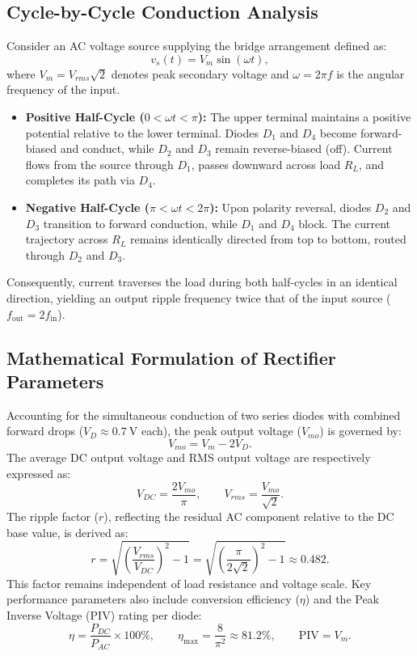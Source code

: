 \subsection{Cycle-by-Cycle Conduction Analysis}
Consider an AC voltage source supplying the bridge arrangement defined as:
\[
v_s(t) = V_m \sin(\omega t),
\]
where $V_m = V_{rms}\sqrt{2}$ denotes peak secondary voltage and $\omega = 2\pi f$ is the angular frequency of the input.
\begin{itemize}
	\item \textbf{Positive Half-Cycle ($0 < \omega t < \pi$):} The upper terminal maintains a positive potential relative to the lower terminal. Diodes $D_1$ and $D_4$ become forward-biased and conduct, while $D_2$ and $D_3$ remain reverse-biased (off). Current flows from the source through $D_1$, passes downward across load $R_L$, and completes its path via $D_4$.
	\item \textbf{Negative Half-Cycle ($\pi < \omega t < 2\pi$):} Upon polarity reversal, diodes $D_2$ and $D_3$ transition to forward conduction, while $D_1$ and $D_4$ block. The current trajectory across $R_L$ remains identically directed from top to bottom, routed through $D_2$ and $D_3$.
\end{itemize}
Consequently, current traverses the load during both half-cycles in an identical direction, yielding an output ripple frequency twice that of the input source ($f_{\text{out}} = 2 f_{\text{in}}$).

\subsection{Mathematical Formulation of Rectifier Parameters}
Accounting for the simultaneous conduction of two series diodes with combined forward drops ($V_D \approx \qty{0.7}{\volt}$ each), the peak output voltage ($V_{mo}$) is governed by:
\[
V_{mo} = V_m - 2V_D.
\]
The average DC output voltage and RMS output voltage are respectively expressed as:
\[
V_{DC} = \frac{2V_{mo}}{\pi}, \qquad V_{rms} = \frac{V_{mo}}{\sqrt{2}}.
\]
The ripple factor ($r$), reflecting the residual AC component relative to the DC base value, is derived as:
\[
r = \sqrt{\left(\frac{V_{rms}}{V_{DC}}\right)^2 - 1} = \sqrt{\left(\frac{\pi}{2\sqrt{2}}\right)^2-1} \approx 0.482.
\]
This factor remains independent of load resistance and voltage scale. Key performance parameters also include conversion efficiency ($\eta$) and the Peak Inverse Voltage (PIV) rating per diode:
\[
\eta = \frac{P_{DC}}{P_{AC}}\times100\%, \qquad \eta_{\max} = \frac{8}{\pi^2}\approx81.2\%, \qquad \text{PIV} = V_m.
\]

